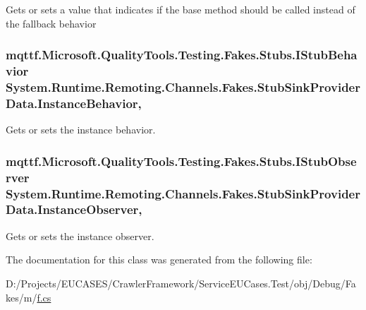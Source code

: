 Gets or sets a value that indicates if the base method should be called instead of the fallback behavior

\hypertarget{class_system_1_1_runtime_1_1_remoting_1_1_channels_1_1_fakes_1_1_stub_sink_provider_data_a114eb5f6abafc6bdcf11a41f4371dad0}{
\subsubsection[{Instance\-Behavior}]{\setlength{\rightskip}{0pt plus 5cm}mqttf.\-Microsoft.\-Quality\-Tools.\-Testing.\-Fakes.\-Stubs.\-I\-Stub\-Behavior System.\-Runtime.\-Remoting.\-Channels.\-Fakes.\-Stub\-Sink\-Provider\-Data.\-Instance\-Behavior\hspace{0.3cm}{\ttfamily [get]}, {\ttfamily [set]}}}\label{class_system_1_1_runtime_1_1_remoting_1_1_channels_1_1_fakes_1_1_stub_sink_provider_data_a114eb5f6abafc6bdcf11a41f4371dad0}


Gets or sets the instance behavior.

\hypertarget{class_system_1_1_runtime_1_1_remoting_1_1_channels_1_1_fakes_1_1_stub_sink_provider_data_aa949f162c60091bc69ea1670288aa1a0}{
\subsubsection[{Instance\-Observer}]{\setlength{\rightskip}{0pt plus 5cm}mqttf.\-Microsoft.\-Quality\-Tools.\-Testing.\-Fakes.\-Stubs.\-I\-Stub\-Observer System.\-Runtime.\-Remoting.\-Channels.\-Fakes.\-Stub\-Sink\-Provider\-Data.\-Instance\-Observer\hspace{0.3cm}{\ttfamily [get]}, {\ttfamily [set]}}}\label{class_system_1_1_runtime_1_1_remoting_1_1_channels_1_1_fakes_1_1_stub_sink_provider_data_aa949f162c60091bc69ea1670288aa1a0}


Gets or sets the instance observer.



The documentation for this class was generated from the following file\-:\begin{DoxyCompactItemize}
\item 
D\-:/\-Projects/\-E\-U\-C\-A\-S\-E\-S/\-Crawler\-Framework/\-Service\-E\-U\-Cases.\-Test/obj/\-Debug/\-Fakes/m/\hyperlink{m_2f_8cs}{f.\-cs}\end{DoxyCompactItemize}
